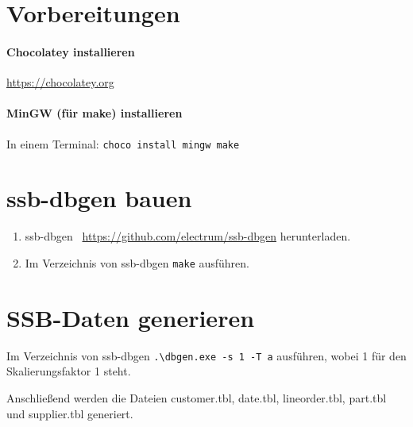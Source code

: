 \section{Vorbereitungen}
\paragraph{Chocolatey installieren}
\url{https://chocolatey.org}
\paragraph{MinGW (für make) installieren}
In einem Terminal:
\lstinline{choco install mingw make}
\section{ssb-dbgen bauen}
\begin{enumerate}
    \item ssb-dbgen~\cite{phillips_electrumssb-dbgen_2023} \url{https://github.com/electrum/ssb-dbgen} herunterladen.
    \item Im Verzeichnis von ssb-dbgen \lstinline{make} ausführen.
\end{enumerate}
\section{\acs{SSB}-Daten generieren}
Im Verzeichnis von ssb-dbgen \lstinline{.\dbgen.exe -s 1 -T a} ausführen, wobei 1 für den Skalierungsfaktor 1 steht.

Anschließend werden die Dateien customer.tbl, date.tbl, lineorder.tbl, part.tbl und supplier.tbl generiert.

